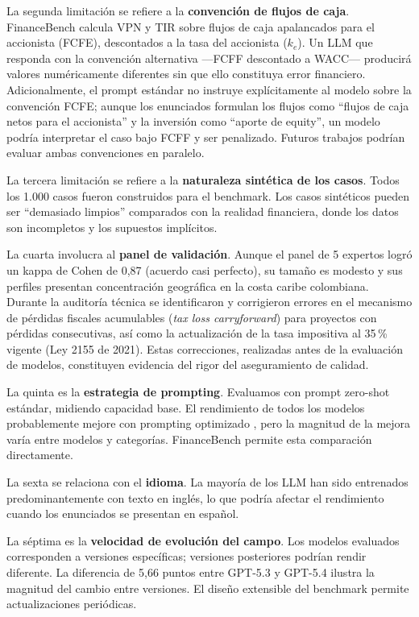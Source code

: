 \documentclass[12pt,a4paper]{article}
\begin{document}
La segunda limitación se refiere a la \textbf{convención de flujos de caja}. FinanceBench calcula VPN y TIR sobre flujos de caja apalancados para el accionista (FCFE), descontados a la tasa del accionista ($k_e$). Un LLM que responda con la convención alternativa ---FCFF descontado a WACC--- producirá valores numéricamente diferentes sin que ello constituya error financiero. Adicionalmente, el prompt estándar no instruye explícitamente al modelo sobre la convención FCFE; aunque los enunciados formulan los flujos como ``flujos de caja netos para el accionista'' y la inversión como ``aporte de equity'', un modelo podría interpretar el caso bajo FCFF y ser penalizado. Futuros trabajos podrían evaluar ambas convenciones en paralelo.

La tercera limitación se refiere a la \textbf{naturaleza sintética de los casos}. Todos los 1.000 casos fueron construidos para el benchmark. Los casos sintéticos pueden ser ``demasiado limpios'' comparados con la realidad financiera, donde los datos son incompletos y los supuestos implícitos.

La cuarta involucra al \textbf{panel de validación}. Aunque el panel de 5 expertos logró un kappa de Cohen de 0,87 (acuerdo casi perfecto), su tamaño es modesto y sus perfiles presentan concentración geográfica en la costa caribe colombiana. Durante la auditoría técnica se identificaron y corrigieron errores en el mecanismo de pérdidas fiscales acumulables (\textit{tax loss carryforward}) para proyectos con pérdidas consecutivas, así como la actualización de la tasa impositiva al 35\,\% vigente (Ley 2155 de 2021). Estas correcciones, realizadas antes de la evaluación de modelos, constituyen evidencia del rigor del aseguramiento de calidad.

La quinta es la \textbf{estrategia de prompting}. Evaluamos con prompt zero-shot estándar, midiendo capacidad base. El rendimiento de todos los modelos probablemente mejore con prompting optimizado \citep{Wei2022,Sahoo2024}, pero la magnitud de la mejora varía entre modelos y categorías. FinanceBench permite esta comparación directamente.

La sexta se relaciona con el \textbf{idioma}. La mayoría de los LLM han sido entrenados predominantemente con texto en inglés, lo que podría afectar el rendimiento cuando los enunciados se presentan en español.

La séptima es la \textbf{velocidad de evolución del campo}. Los modelos evaluados corresponden a versiones específicas; versiones posteriores podrían rendir diferente. La diferencia de 5,66 puntos entre GPT-5.3 y GPT-5.4 ilustra la magnitud del cambio entre versiones. El diseño extensible del benchmark permite actualizaciones periódicas.
\end{document}
